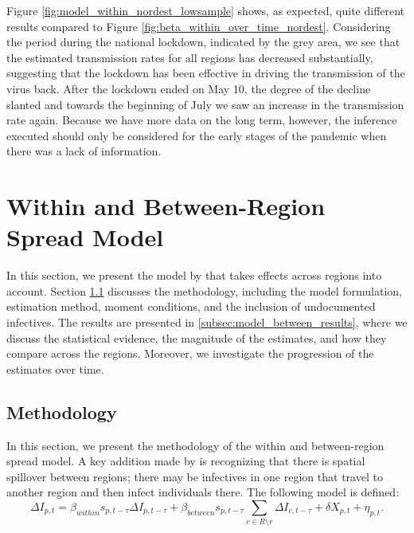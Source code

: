 \documentclass[12pt]{article}
\begin{document}
	Figure \ref{fig:model_within_nordest_lowsample} shows, as expected, quite different results compared to Figure \ref{fig:beta_within_over_time_nordest}. Considering the period during the national lockdown, indicated by the grey area, we see that the estimated transmission rates for all regions has decreased substantially, suggesting that the lockdown has been effective in driving the transmission of the virus back. After the lockdown ended on May 10, the degree of the decline slanted and towards the beginning of July we saw an increase in the transmission rate again. Because we have more data on the long term, however, the inference executed should only be considered for the early stages of the pandemic when there was a lack of information.
	
	\section{Within and Between-Region Spread Model} \label{sec:model_between}
	In this section, we present the model by \textcite{adda2016economic} that takes effects across regions into account. Section \ref{subsec:model_between_methodology} discusses the methodology, including the model formulation, estimation method, moment conditions, and the inclusion of undocumented infectives. The results are presented in \ref{subsec:model_between_results}, where we discuss the statistical evidence, the magnitude of the estimates, and how they compare across the regions. Moreover, we investigate the progression of the estimates over time.
	
	\subsection{Methodology} \label{subsec:model_between_methodology}
	In this section, we present the methodology of the within and between-region spread model. A key addition made by \textcite{adda2016economic} is recognizing that there is spatial spillover between regions; there may be infectives in one region that travel to another region and then infect individuals there. The following model is defined:
	\begin{equation} \label{eq:model_between}
	    \Delta I_{p,t} = \beta_{within}s_{p,t-\tau}\Delta I_{p,t-\tau} + \beta_{between}s_{p,t-\tau} \sum_{c \in R \setminus r} \Delta I_{c, t-\tau} + \delta X_{p,t} + \eta_{p,t}.
	\end{equation}
	
\end{document}
